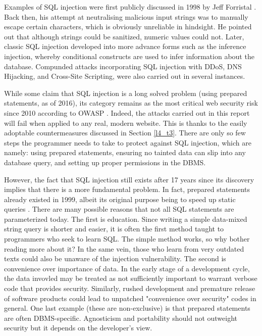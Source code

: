 Examples of SQL injection were first publicly discussed in 1998 by Jeff Forristal \cite{phrack98}. Back then, his attempt at neutralising malicious input strings was to manually escape certain characters, which is obviously unreliable in hindsight. He pointed out that although strings could be sanitized, numeric values could not. Later, classic SQL injection developed into more advance forms such as the inference injection, whereby conditional constructs are used to infer information about the database. Compunded attacks incorporating SQL injection with DDoS, DNS Hijacking, and Cross-Site Scripting, were also carried out in several instances.

While some claim that SQL injection is a long solved problem (using prepared statements, as of 2016), its category remains as the most critical web security risk since 2010 according to OWASP \cite{Owasp2013}. Indeed, the attacks carried out in this report will fail when applied to any real, modern website. This is thanks to the easily adoptable countermeasures discussed in Section \ref{l4_t3}. There are only so few steps the programmer needs to take to protect against SQL injection, which are namely: using prepared statements, ensuring no tainted data can slip into any database query, and setting up proper permissions in the DBMS.

However, the fact that SQL injection still exists after 17 years since its discovery implies that there is a more fundamental problem. In fact, prepared statements already existed in 1999, albeit its original purpose being to speed up static queries \cite{pgPrepStm99}. There are many possible reasons that not all SQL statements are parameterized today. The first is education. Since writing a simple data-mixed string query is shorter and easier, it is often the first method taught to programmers who seek to learn SQL. The simple method works, so why bother reading more about it? In the same vein, those who learn from very outdated texts could also be unaware of the injection vulnerability. The second is convenience over importance of data. In the early stage of a development cycle, the data invovled may be treated as not sufficiently important to warrant verbose code that provides security. Similarly, rushed development and premature release of software products could lead to unpatched "convenience over security" codes in general. One last example (these are non-exclusive) is that prepared statements are often DBMS-specific. Agnosticism and portability should not outweight security but it depends on the developer's view.

